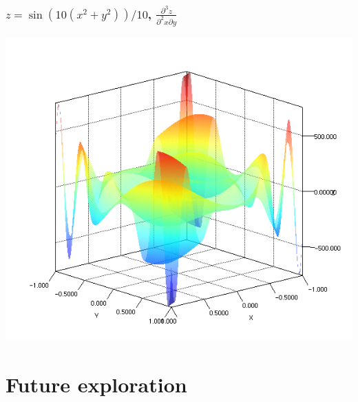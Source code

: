 \documentclass{beamer}
\begin{document}
    \begin{frame}
        \frametitle{$z = \sin(10(x^2 + y^2)) / 10$, $\frac{\partial^3 z}{\partial^2 x \partial y}$}
        \begin{center}
            \includegraphics[scale=0.4]{plot3d.png}
        \end{center}
    \end{frame}

    \section{Future exploration}
\end{document}

